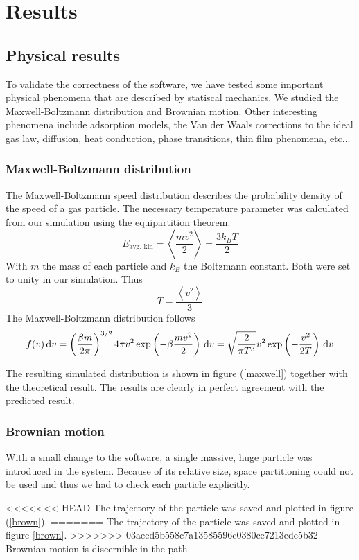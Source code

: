 \section{Results}
\subsection{Physical results}

To validate the correctness of the software, we have tested some important 
physical phenomena that are described by statiscal mechanics. We studied the 
Maxwell-Boltzmann distribution and Brownian motion. Other interesting phenomena 
include adsorption models, the Van der Waals corrections to the ideal gas law, 
diffusion, heat conduction, phase transitions, thin film phenomena, etc...

\subsubsection{Maxwell-Boltzmann distribution}
The Maxwell-Boltzmann speed distribution describes the probability density of 
the speed of a gas particle. The necessary temperature parameter was calculated 
from our simulation using the equipartition theorem.
$$
E_{\textrm{avg, kin}} = \left< \frac{mv^2}{2} \right> = \frac{3k_BT}{2}
$$
With $m$ the mass of each particle and $k_B$ the Boltzmann constant. Both were 
set to unity in our simulation. Thus
$$
T = \frac{\left< v^2 \right>}{3}
$$
The Maxwell-Boltzmann distribution follows
$$
f(v)\,\mathrm d v = \left( \frac{\beta m}{2 \pi} \right)^{3/2} 4 \pi v^2
\exp\left( -\beta \frac{mv^2}{2}\right) \,\mathrm d v =
\sqrt{ \frac{2}{\pi T^3} } v^2 \exp \left(-\frac{v^2}{2T}\right) \,\mathrm d v
$$

The resulting simulated distribution is shown in figure (\ref{maxwell}) 
together with the theoretical result. The results are clearly in perfect 
agreement with the predicted result.

\subsubsection{Brownian motion}
With a small change to the software, a single massive, huge particle was 
introduced in the system. Because of its relative size, space partitioning 
could not be used and thus we had to check each particle explicitly. 


<<<<<<< HEAD
The trajectory of the particle was saved and plotted in figure (\ref{brown}).  
=======
The trajectory of the particle was saved and plotted in figure \ref{brown}.  
>>>>>>> 03aeed5b558c7a13585596c0380ce7213ede5b32
Brownian motion is discernible in the path.


